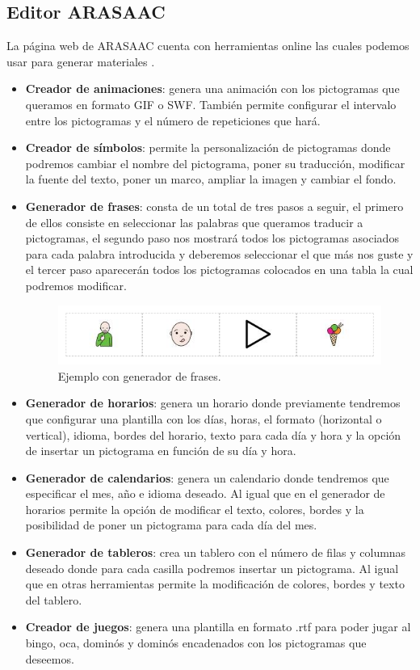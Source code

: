\subsection{Editor ARASAAC}
La página web de ARASAAC cuenta con herramientas online las cuales podemos usar para generar materiales .
\begin{itemize}
\item \textbf{Creador de animaciones}: genera una animación con los pictogramas que queramos en formato GIF o SWF. También permite configurar el intervalo entre los pictogramas y el número de repeticiones que hará.

\item \textbf{Creador de símbolos}: permite la personalización de pictogramas donde podremos cambiar el nombre del pictograma, poner su traducción, modificar la fuente del texto, poner un marco, ampliar la imagen y cambiar el fondo.

\item \textbf{Generador de frases}: consta de un total de tres pasos a seguir, el primero de ellos consiste en seleccionar las palabras que queramos traducir a pictogramas, el segundo paso nos mostrará todos los pictogramas asociados para cada palabra introducida y deberemos seleccionar el que más nos guste y el tercer paso aparecerán todos los pictogramas colocados en una tabla la cual podremos modificar.

\begin{figure}[h!]
	\centering
	\includegraphics[width=0.7\linewidth]{Imagenes/Bitmap/Frase ARASAAC}
	\caption{Ejemplo con generador de frases.}
	\label{fig:frase-arasaac}
\end{figure}


\item \textbf{Generador de horarios}: genera un horario donde previamente tendremos que configurar una plantilla con los días, horas, el formato (horizontal o vertical), idioma, bordes del horario, texto para cada día y hora y la opción de insertar un pictograma en función de su día y hora.

\item \textbf{Generador de calendarios}: genera un calendario donde tendremos que especificar el mes, año e idioma deseado. Al igual que en el generador de horarios permite la opción de modificar el texto, colores, bordes y la posibilidad de poner un pictograma para cada día del mes.

\item \textbf{Generador de tableros}: crea un tablero con el número de filas y columnas deseado donde para cada casilla podremos insertar un pictograma. Al igual que en otras herramientas permite la modificación de colores, bordes y  texto del tablero.

\item \textbf{Creador de juegos}: genera una plantilla en formato .rtf para poder jugar al bingo, oca, dominós y dominós encadenados con los pictogramas que deseemos.
\end{itemize}

